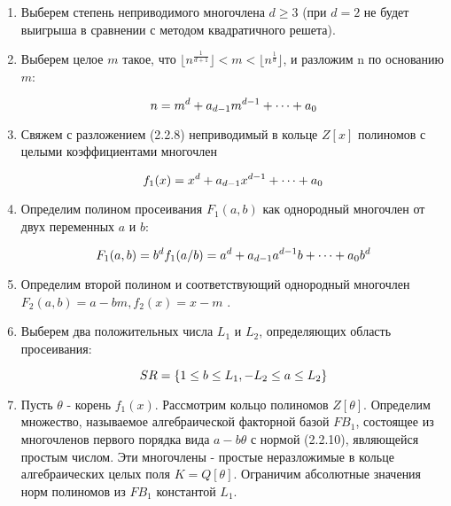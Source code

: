     \begin{enumerate}
      \item Выберем степень неприводимого многочлена {$d \ge 3$} (при {$d = 2$} не будет выигрыша в сравнении с методом квадратичного решета).
      \item Выберем целое {$m$} такое, что {$\lfloor n^\frac{1}{d+1} \rfloor < m < \lfloor n^\frac{1}{d} \rfloor$}, и разложим n по 
	основанию {$m$}:
	
	  \begin{equation}
	   \textit{{$ n = m^d + a_{d-1}m^{d-1} + \dots + a_0 $}}
	  \end{equation}

      \item Свяжем с разложением (2.2.8) неприводимый в кольце {$Z[x]$} полиномов с целыми коэффициентами многочлен
      
	\begin{equation}
	 \textit{{$ f_1(x)=x^d + a_{d-1}x^{d-1} + \dots + a_0 $}}
	\end{equation}

      \item Определим полином просеивания {$F_1(a,b)$} как однородный многочлен от двух переменных {$a$} и {$b$}:
      
	\begin{equation}
	 \textit{{$ F_1(a,b) = b^d f_1(a/b) = a^d + a_{d-1}a^{d-1}b + \dots + a_0 b^d $}}
	\end{equation}

      \item Определим второй полином и соответствующий однородный многочлен {$F_2(a,b)=a-bm, f_2(x)=x-m$} .
      \item Выберем два положительных числа {$L_1$} и {$L_2$}, определяющих область просеивания:
      
	\begin{equation}
	 \textit{{$ SR = \{ 1 \le b \le L_1, -L_2 \le a \le L_2 \} $}}
	\end{equation}

      \item Пусть {$\theta$} - корень {$f_1(x)$}. Рассмотрим кольцо полиномов {$Z[\theta]$}. Определим множество, называемое алгебраической 
	факторной базой {$FB_1$}, состоящее из многочленов первого порядка вида {$a-b\theta$} с нормой (2.2.10), являющейся простым числом. 
	Эти многочлены - простые неразложимые в кольце алгебраических целых поля {$K=Q[\theta]$}. Ограничим абсолютные значения норм 
	полиномов из {$FB_1$} константой {$L_1$}.
	

\end{enumerate}
